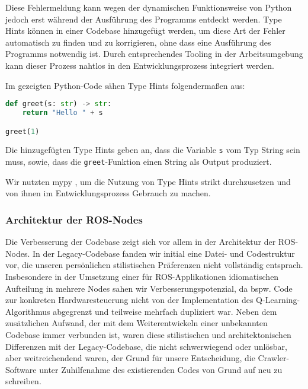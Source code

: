 Diese Fehlermeldung kann wegen der dynamischen Funktionsweise von Python jedoch erst während der Ausführung des Programms entdeckt werden. Type Hints können in einer Codebase hinzugefügt werden, um diese Art der Fehler automatisch zu finden und zu korrigieren, ohne dass eine Ausführung des Programms notwendig ist. Durch entsprechendes Tooling in der Arbeitsumgebung kann dieser Prozess nahtlos in den Entwicklungsprozess integriert werden.

Im gezeigten Python-Code sähen Type Hints folgendermaßen aus:

\begin{lstlisting}[language=Python]
def greet(s: str) -> str:
	return "Hello " + s

greet(1)
\end{lstlisting}

Die hinzugefügten Type Hints geben an, dass die Variable \texttt{s} vom Typ String sein muss, sowie, dass die \texttt{greet}-Funktion einen String als Output produziert.

Wir nutzten mypy \cite{mypy}, um die Nutzung von Type Hints strikt durchzusetzen und von ihnen im Entwicklungsprozess Gebrauch zu machen.

\subsubsection{Architektur der ROS-Nodes}


Die Verbesserung der Codebase zeigt sich vor allem in der Architektur der ROS-Nodes. In der Legacy-Codebase fanden wir initial eine Datei- und Codestruktur vor, die unseren persönlichen stilistischen Präferenzen nicht vollständig entsprach. Insbesondere in der Umsetzung einer für ROS-Applikationen idiomatischen Aufteilung in mehrere Nodes sahen wir Verbesserungspotenzial, da bspw. Code zur konkreten Hardwaresteuerung nicht von der Implementation des Q-Learning-Algorithmus abgegrenzt und teilweise mehrfach dupliziert war. Neben dem zusätzlichen Aufwand, der mit dem Weiterentwickeln einer unbekannten Codebase immer verbunden ist, waren diese stilistischen und architektonischen Differenzen mit der Legacy-Codebase, die nicht schwerwiegend oder unlösbar, aber weitreichendend waren, der Grund für unsere Entscheidung, die Crawler-Software unter Zuhilfenahme des existierenden Codes von Grund auf neu zu schreiben. 

